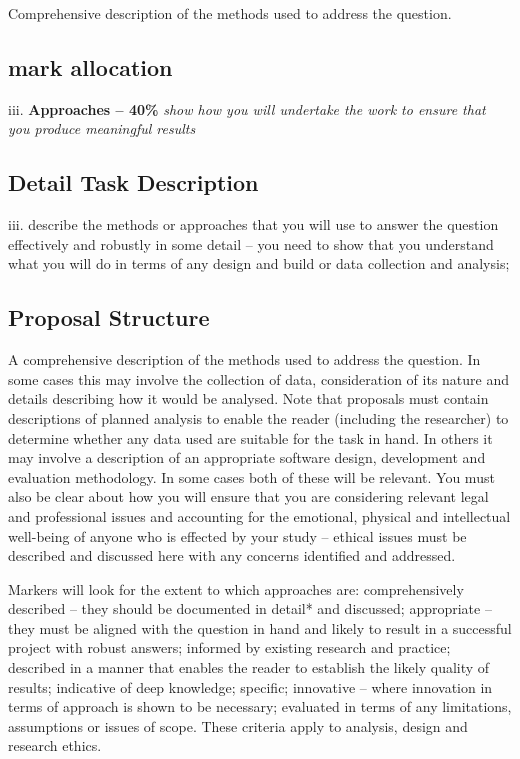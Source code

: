 Comprehensive description of the methods used to address the question.

\subsection{mark allocation}

iii. \textbf{Approaches -- 40\%}
\textit{show how you will undertake the work to ensure that you produce meaningful results}


\subsection{Detail Task Description} 
iii. describe the methods or approaches that you will use to answer the question effectively and robustly in some detail -- you need to show that you understand what you will do in terms of any design and build or data collection and analysis;

\subsection{Proposal Structure}

A comprehensive description of the methods used to address the question. In some cases this may involve the collection of data, consideration of its nature and details describing how it would be analysed. Note that proposals must contain descriptions of planned analysis to enable the reader (including the researcher) to determine whether any data used are suitable for the task in hand. In others it may involve a description of an appropriate software design, development and evaluation methodology. In some cases both of these will be relevant. You must also be clear about how you will ensure that you are considering relevant legal and professional issues and accounting for the emotional, physical and intellectual well-being of anyone who is effected by your study -- ethical issues must be described and discussed here with any concerns identified and addressed.

Markers will look for the extent to which approaches are: comprehensively described -- they should be documented in detail* and discussed; appropriate -- they must be aligned with the question in hand and likely to result in a successful project with robust answers; informed by existing research and practice; described in a manner that enables the reader to establish the likely quality of results; indicative of deep knowledge; specific; innovative -- where innovation in terms of approach is shown to be necessary; evaluated in terms of any limitations, assumptions or issues of scope. These criteria apply to analysis, design and research ethics.

